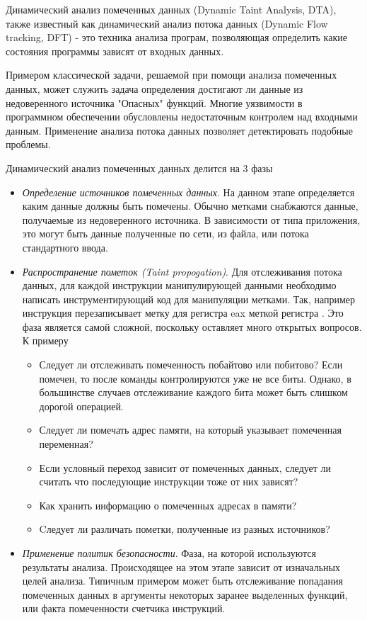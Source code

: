 Динамический анализ помеченных данных (Dynamic Taint Analysis, DTA), также известный как динамический анализ потока данных (Dynamic Flow tracking, DFT) - это техника анализа програм, позволяющая определить какие состояния программы зависят от входных данных.

Примером классической задачи, решаемой при помощи анализа помеченных данных, может служить задача определения достигают ли данные из недоверенного источника "Опасных" функций. Многие уязвимости в программном обеспечении обусловлены недостаточным контролем над входными данным. Применение анализа потока данных позволяет детектировать подобные проблемы.

Динамический анализ помеченных данных делится на 3 фазы

    \begin{itemize}
        \item {\em Определение источников помеченных данных}. На данном этапе определяется каким данные должны быть помечены. Обычно метками снабжаются данные, получаемые из недоверенного
        источника. В зависимости от типа приложения, это могут быть данные полученные по сети, из файла, или потока стандартного ввода.
        \item {\em Распространение пометок (Taint propogation)}. Для отслеживания потока данных, 
        для каждой инструкции манипулирующей данными необходимо написать инструментирующий код для манипуляции метками. Так, например инструкция  перезаписывает метку для регистра eax меткой регистра . Это фаза является самой сложной, поскольку оставляет много открытых вопросов. К примеру
        \begin{itemize}
            \item Следует ли отслеживать помеченность побайтово или побитово? Если  помечен, то после команды  контролируются уже не все биты. Однако, в большинстве случаев отслеживание каждого бита может быть слишком дорогой операцией.
            \item Следует ли помечать адрес памяти, на который указывает помеченная переменная?
            \item Если условный переход зависит от помеченных данных, следует ли считать что последующие инструкции тоже от них зависят?
            \item Как хранить информацию о помеченных адресах в памяти?
            \item Cледует ли различать пометки, полученные из разных источников?
        \end{itemize}
        \item {\em Применение политик безопасности}. Фаза, на которой используются результаты анализа. Происходящее на этом этапе зависит от изначальных целей анализа. Типичным примером может быть отслеживание попадания помеченных данных в аргументы некоторых заранее выделенных функций, или факта помеченности счетчика инструкций.
    \end{itemize}


